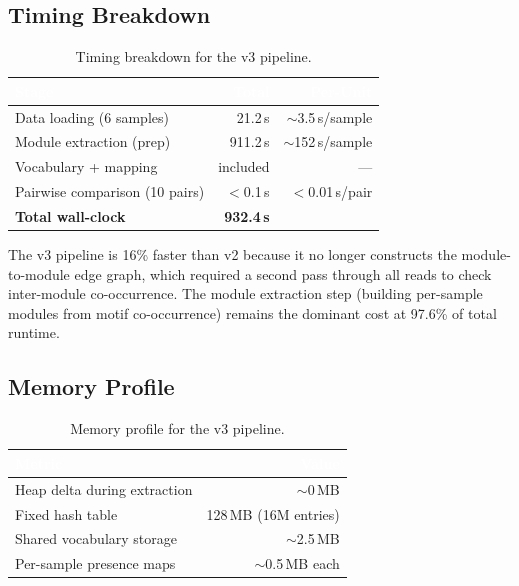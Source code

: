 \documentclass{../yalumba}
\begin{document}
\subsection{Timing Breakdown}

\begin{table}[H]
\centering
\tablestyle
\caption{Timing breakdown for the v3 pipeline.}
\label{tab:timing}
\begin{tabular}{@{}lrr@{}}
\toprule
\rowcolor{table-header}
\textcolor{white}{\textbf{Stage}} &
\textcolor{white}{\textbf{Total}} &
\textcolor{white}{\textbf{Per-Unit}} \\
\midrule
Data loading (6 samples)         & 21.2\,s   & $\sim$3.5\,s/sample \\
Module extraction (prep)         & 911.2\,s  & $\sim$152\,s/sample \\
Vocabulary + mapping             & included  & --- \\
Pairwise comparison (10 pairs)   & $<$0.1\,s & $<$0.01\,s/pair \\
\midrule
\textbf{Total wall-clock}       & \textbf{932.4\,s} & \\
\bottomrule
\end{tabular}
\end{table}


The v3 pipeline is 16\% faster than v2 because it no longer constructs the
module-to-module edge graph, which required a second pass through all reads
to check inter-module co-occurrence.  The module extraction step (building
per-sample modules from motif co-occurrence) remains the dominant cost at
97.6\% of total runtime.

\subsection{Memory Profile}

\begin{table}[H]
\centering
\tablestyle
\caption{Memory profile for the v3 pipeline.}
\label{tab:memory}
\begin{tabular}{@{}lr@{}}
\toprule
\rowcolor{table-header}
\textcolor{white}{\textbf{Metric}} &
\textcolor{white}{\textbf{Value}} \\
\midrule
Heap delta during extraction & $\sim$0\,MB \\
Fixed hash table & 128\,MB (16M entries) \\
Shared vocabulary storage & $\sim$2.5\,MB \\
Per-sample presence maps & $\sim$0.5\,MB each \\
\bottomrule
\end{tabular}
\end{table}
\end{document}
